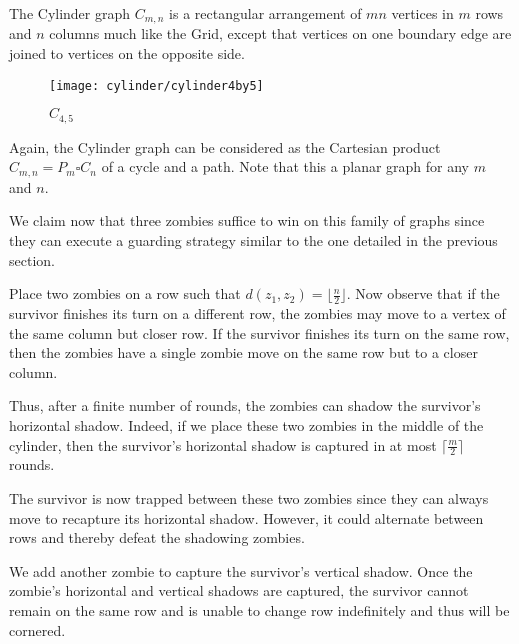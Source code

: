 
The Cylinder graph $C_{m,n}$ is a rectangular arrangement of $mn$ vertices in
$m$ rows and $n$ columns much like the Grid, except that vertices on one
boundary edge are joined to vertices on the opposite side.

\begin{figure}[h]
  \centering
  \texttt{[image: cylinder/cylinder4by5]}
  \caption{$C_{4,5}$}
\end{figure}

Again, the Cylinder graph can be considered as the Cartesian product $C_{m,n} = P_m \square C_n$ 
of a cycle and a path. Note that this a planar graph for any $m$ and $n$.

We claim now that three zombies suffice to win on this family of graphs since they can execute
a guarding strategy similar to the one detailed in the previous section.

Place two zombies on a row such that $d(z_1, z_2) = \lfloor \frac{n}{2} \rfloor$.
Now observe that if the survivor finishes its turn on a different row, the zombies may move
to a vertex of the same column but closer row.
If the survivor finishes its turn on the same row, then the zombies have a single
zombie move on the same row but to a closer column.

Thus, after a finite number of rounds, the zombies can shadow the survivor's
horizontal shadow. Indeed, if we place these two zombies in the middle
of the cylinder, then the survivor's horizontal shadow is captured in at most
$\lceil \frac{m}{2} \rceil$ rounds.

The survivor is now trapped between these two zombies since they
can always move to recapture its horizontal shadow.
However, it could alternate between rows and thereby defeat the shadowing zombies.

We add another zombie to capture the survivor's vertical shadow.
Once the zombie's horizontal and vertical shadows are captured, the survivor
cannot remain on the same row and is unable to change row
indefinitely and thus will be cornered.
